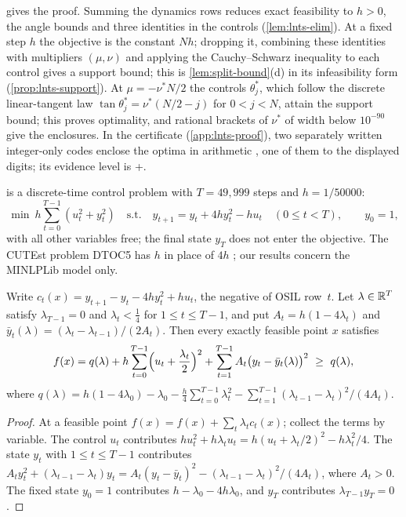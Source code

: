  gives the proof.
Summing the dynamics rows reduces exact feasibility to $h>0$, the angle bounds and three identities in the controls (\cref{lem:lnts-elim}).
At a fixed step $h$ the objective is the constant $Nh$; dropping it, combining these identities with multipliers $(\mu,\nu)$ and applying the Cauchy--Schwarz inequality to each control gives a support bound; this is \cref{lem:split-bound}(d) in its infeasibility form (\cref{prop:lnts-support}).
At $\mu=-\nu^*N/2$ the controls $\theta^*_j$, which follow the discrete linear-tangent law $\tan\theta^*_j=\nu^*(N/2-j)$ for $0<j<N$, attain the support bound; this proves optimality, and rational brackets of $\nu^*$ of width below $10^{-90}$ give the enclosures.
In the certificate (\cref{app:lnts-proof}), two separately written integer-only codes enclose the optima in arithmetic , one of them to the displayed digits; its evidence level is +.

 is a discrete-time control problem with $T=49{,}999$ steps and $h=1/50000$:
\[
  \min\ h\sum_{t=0}^{T-1}(u_t^2+y_t^2)\quad\text{s.t.}\quad y_{t+1}=y_t+4hy_t^2-hu_t\quad(0\le t<T),\qquad y_0=1,
\]
with all other variables free; the final state $y_T$ does not enter the objective.
The CUTEst problem DTOC5 has $h$ in place of $4h$ \citep{luksan2026-cutest-source-forms-for-dtoc5,coleman1993-the-global-convergence-of-a}; our results concern the MINLPLib model only.

\begin{proposition}\label{prop:dtoc5-identity}
Write $c_t(x)=y_{t+1}-y_t-4hy_t^2+hu_t$, the negative of OSIL row~$t$.
Let $\lambda\in\mathbb{R}^T$ satisfy $\lambda_{T-1}=0$ and $\lambda_t<\frac14$ for $1\le t\le T-1$, and put $A_t=h(1-4\lambda_t)$ and $\bar y_t(\lambda)=(\lambda_t-\lambda_{t-1})/(2A_t)$.
Then every exactly feasible point $x$ satisfies
\begin{equation}\label{eq:dtoc5-squares}
  f(x)=q(\lambda)+h\sum_{t=0}^{T-1}\Bigl(u_t+\frac{\lambda_t}2\Bigr)^2+\sum_{t=1}^{T-1}A_t\bigl(y_t-\bar y_t(\lambda)\bigr)^2\ \ge\ q(\lambda),
\end{equation}
where $q(\lambda)=h(1-4\lambda_0)-\lambda_0-\frac h4\sum_{t=0}^{T-1}\lambda_t^2-\sum_{t=1}^{T-1}(\lambda_{t-1}-\lambda_t)^2/(4A_t)$.
\end{proposition}

\begin{proof}
At a feasible point $f(x)=f(x)+\sum_t\lambda_tc_t(x)$; collect the terms by variable.
The control $u_t$ contributes $hu_t^2+h\lambda_tu_t=h(u_t+\lambda_t/2)^2-h\lambda_t^2/4$.
The state $y_t$ with $1\le t\le T-1$ contributes $A_ty_t^2+(\lambda_{t-1}-\lambda_t)y_t=A_t(y_t-\bar y_t)^2-(\lambda_{t-1}-\lambda_t)^2/(4A_t)$, where $A_t>0$.
The fixed state $y_0=1$ contributes $h-\lambda_0-4h\lambda_0$, and $y_T$ contributes $\lambda_{T-1}y_T=0$.
\end{proof}

